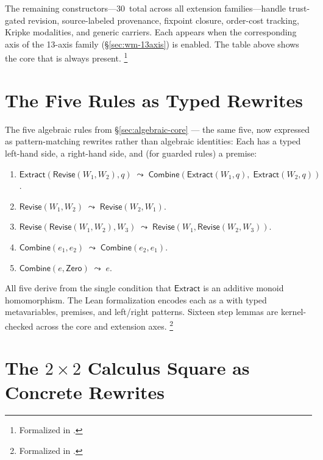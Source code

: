 \documentclass[11pt,openany]{report}
\begin{document}
\noindent
The remaining constructors---30~total across all extension
families---handle trust-gated revision, source-labeled provenance,
fixpoint closure, order-cost tracking, Kripke modalities, and generic
carriers.  Each appears when the corresponding axis of the 13-axis
family (\S\ref{sec:wm-13axis}) is enabled.  The table above shows the
core that is always present.%
\footnote{Formalized in
.}


\section{The Five Rules as Typed Rewrites}
\label{sec:five-as-rewrites}

The five algebraic rules from \S\ref{sec:algebraic-core} --- the
same five, now expressed as pattern-matching rewrites rather than
algebraic identities:  Each has a typed left-hand
side, a right-hand side, and (for guarded rules) a premise:

\begin{enumerate}
\item $\mathsf{Extract}(\mathsf{Revise}(W_1, W_2), q) \;\leadsto\;
  \mathsf{Combine}(\mathsf{Extract}(W_1, q),\;
  \mathsf{Extract}(W_2, q))$.

\item $\mathsf{Revise}(W_1, W_2) \;\leadsto\;
  \mathsf{Revise}(W_2, W_1)$.

\item $\mathsf{Revise}(\mathsf{Revise}(W_1, W_2), W_3)
  \;\leadsto\; \mathsf{Revise}(W_1, \mathsf{Revise}(W_2, W_3))$.

\item $\mathsf{Combine}(e_1, e_2) \;\leadsto\;
  \mathsf{Combine}(e_2, e_1)$.

\item $\mathsf{Combine}(e, \mathsf{Zero}) \;\leadsto\; e$.
\end{enumerate}

\noindent
All five derive from the single condition that $\mathsf{Extract}$ is
an additive monoid homomorphism.  The Lean formalization encodes each
as a  with typed metavariables, premises, and
left/right patterns.  Sixteen step lemmas are kernel-checked across
the core and extension axes.%
\footnote{Formalized in
.}


\section{The \texorpdfstring{$2 \times 2$}{2x2} Calculus Square
  as Concrete Rewrites}
\end{document}
